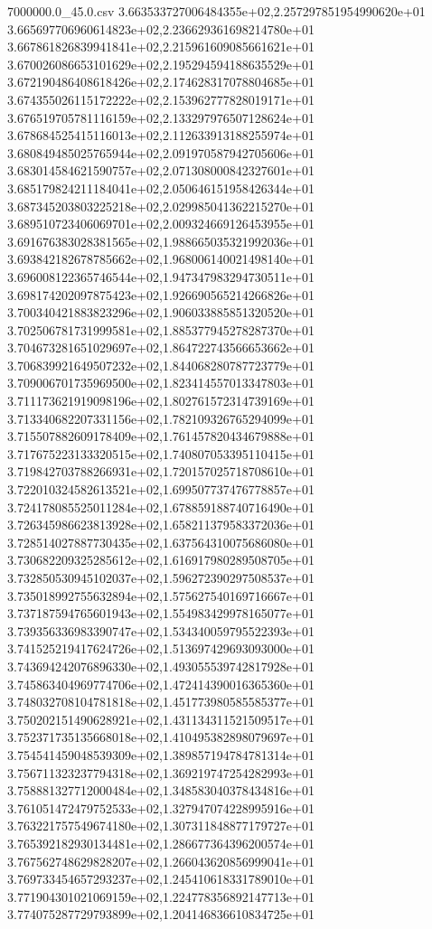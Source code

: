 \begin{filecontents*}{7000000.0_45.0.csv}
3.663533727006484355e+02,2.257297851954990620e+01
3.665697706960614823e+02,2.236629361698214780e+01
3.667861826839941841e+02,2.215961609085661621e+01
3.670026086653101629e+02,2.195294594188635529e+01
3.672190486408618426e+02,2.174628317078804685e+01
3.674355026115172222e+02,2.153962777828019171e+01
3.676519705781116159e+02,2.133297976507128624e+01
3.678684525415116013e+02,2.112633913188255974e+01
3.680849485025765944e+02,2.091970587942705606e+01
3.683014584621590757e+02,2.071308000842327601e+01
3.685179824211184041e+02,2.050646151958426344e+01
3.687345203803225218e+02,2.029985041362215270e+01
3.689510723406069701e+02,2.009324669126453955e+01
3.691676383028381565e+02,1.988665035321992036e+01
3.693842182678785662e+02,1.968006140021498140e+01
3.696008122365746544e+02,1.947347983294730511e+01
3.698174202097875423e+02,1.926690565214266826e+01
3.700340421883823296e+02,1.906033885851320520e+01
3.702506781731999581e+02,1.885377945278287370e+01
3.704673281651029697e+02,1.864722743566653662e+01
3.706839921649507232e+02,1.844068280787723779e+01
3.709006701735969500e+02,1.823414557013347803e+01
3.711173621919098196e+02,1.802761572314739169e+01
3.713340682207331156e+02,1.782109326765294099e+01
3.715507882609178409e+02,1.761457820434679888e+01
3.717675223133320515e+02,1.740807053395110415e+01
3.719842703788266931e+02,1.720157025718708610e+01
3.722010324582613521e+02,1.699507737476778857e+01
3.724178085525011284e+02,1.678859188740716490e+01
3.726345986623813928e+02,1.658211379583372036e+01
3.728514027887730435e+02,1.637564310075686080e+01
3.730682209325285612e+02,1.616917980289508705e+01
3.732850530945102037e+02,1.596272390297508537e+01
3.735018992755632894e+02,1.575627540169716667e+01
3.737187594765601943e+02,1.554983429978165077e+01
3.739356336983390747e+02,1.534340059795522393e+01
3.741525219417624726e+02,1.513697429693093000e+01
3.743694242076896330e+02,1.493055539742817928e+01
3.745863404969774706e+02,1.472414390016365360e+01
3.748032708104781818e+02,1.451773980585585377e+01
3.750202151490628921e+02,1.431134311521509517e+01
3.752371735135668018e+02,1.410495382898079697e+01
3.754541459048539309e+02,1.389857194784781314e+01
3.756711323237794318e+02,1.369219747254282993e+01
3.758881327712000484e+02,1.348583040378434816e+01
3.761051472479752533e+02,1.327947074228995916e+01
3.763221757549674180e+02,1.307311848877179727e+01
3.765392182930134481e+02,1.286677364396200574e+01
3.767562748629828207e+02,1.266043620856999041e+01
3.769733454657293237e+02,1.245410618331789010e+01
3.771904301021069159e+02,1.224778356892147713e+01
3.774075287729793899e+02,1.204146836610834725e+01

\end{filecontents*}
